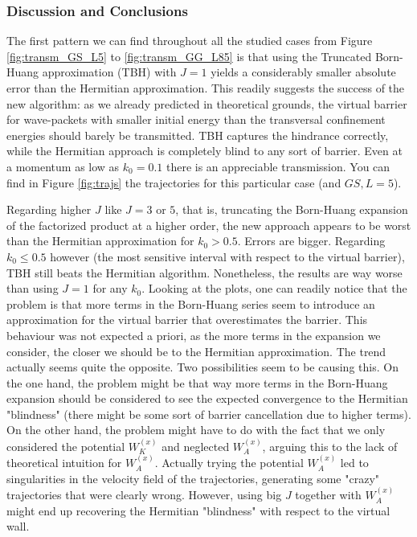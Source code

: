 \documentclass[11pt, a4paper]{article} %
\begin{document}
  

\newpage
\subsubsection{Discussion and Conclusions}
The first pattern we can find throughout all the studied cases from Figure \ref{fig:transm_GS_L5} to \ref{fig:transm_GG_L85} is that using the Truncated Born-Huang approximation (TBH) with $J=1$ yields a considerably smaller absolute error than the Hermitian approximation. This readily suggests the success of the new algorithm: as we already predicted in theoretical grounds, the virtual barrier for wave-packets with smaller initial energy than the transversal confinement energies should barely be transmitted. TBH captures the hindrance correctly, while the Hermitian approach is completely blind to any sort of barrier. Even at a momentum as low as $k_0=0.1$ there is an appreciable transmission. You can find in Figure \ref{fig:trajs} the trajectories for this particular case (and $GS, L=5$).

Regarding higher $J$ like $J=3$ or $5$, that is, truncating the Born-Huang expansion of the factorized product at a higher order, the new approach appears to be worst than the Hermitian approximation for $k_0>0.5$. Errors are bigger. Regarding $k_0\leq0.5$ however (the most sensitive interval with respect to the virtual barrier), TBH still beats the Hermitian algorithm. Nonetheless, the results are way worse than using $J=1$ for any $k_0$. Looking at the plots, one can readily notice that the problem is that more terms in the Born-Huang series seem to introduce an approximation for the virtual barrier that overestimates the barrier. This behaviour was not expected a priori, as the more terms in the expansion we consider, the closer we should be to the Hermitian approximation. The trend actually seems quite the opposite. Two possibilities seem to be causing this. On the one hand, the problem might be that way more terms in the Born-Huang expansion should be considered to see the expected convergence to the Hermitian "blindness" (there might be some sort of barrier cancellation due to higher terms). On the other hand, the problem might have to do with the fact that we only considered the potential $W_K^{(x)}$ and neglected $W_A^{(x)}$, arguing this to the lack of theoretical intuition for $W_A^{(x)}$. Actually trying the potential $W_A^{(x)}$ led to singularities in the velocity field of the trajectories, generating some "crazy" trajectories that were clearly wrong. However, using big $J$ together with $W_A^{(x)}$ might end up recovering the Hermitian "blindness" with respect to the virtual wall.
\end{document}
